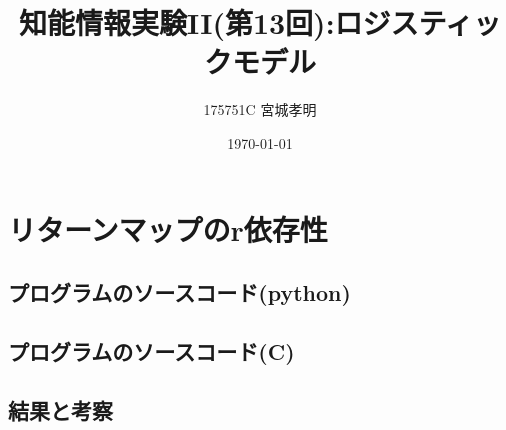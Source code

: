 \documentclass[a4paper,11pt,titlepage]{jarticle}
\title{知能情報実験II(第13回):ロジスティックモデル}
\author{175751C 宮城孝明}
\date{\today}
\begin{document}
\maketitle
\tableofcontents
\clearpage

\section{リターンマップのr依存性}
\subsection{プログラムのソースコード(python)}

\subsection{プログラムのソースコード(C)}

\subsection{結果と考察}
\end{document}
